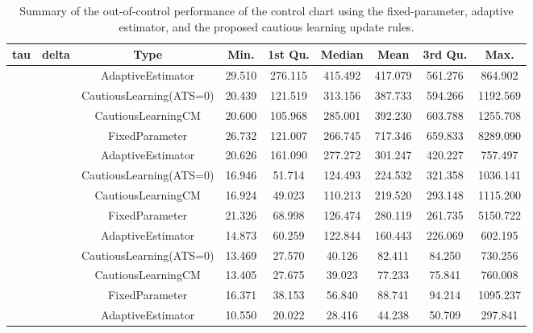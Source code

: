 \begin{table}[!h]

\caption{Summary of the out-of-control performance of the control chart using the fixed-parameter, adaptive estimator, and the proposed cautious learning update rules.}
\centering
\begin{tabular}[t]{ccccccccc}
\toprule
tau & delta & Type & Min. & 1st Qu. & Median & Mean & 3rd Qu. & Max.\\
\midrule
 &  & AdaptiveEstimator & 29.510 & 276.115 & 415.492 & 417.079 & 561.276 & 864.902\\

 &  & CautiousLearning(ATS=0) & 20.439 & 121.519 & 313.156 & 387.733 & 594.266 & 1192.569\\

 &  & CautiousLearningCM & 20.600 & 105.968 & 285.001 & 392.230 & 603.788 & 1255.708\\

 & \multirow[t]{-4}{*}{\centering\arraybackslash 0.25} & FixedParameter & 26.732 & 121.007 & 266.745 & 717.346 & 659.833 & 8289.090\\
\cmidrule{2-9}
 &  & AdaptiveEstimator & 20.626 & 161.090 & 277.272 & 301.247 & 420.227 & 757.497\\

 &  & CautiousLearning(ATS=0) & 16.946 & 51.714 & 124.493 & 224.532 & 321.358 & 1036.141\\

 &  & CautiousLearningCM & 16.924 & 49.023 & 110.213 & 219.520 & 293.148 & 1115.200\\

 & \multirow[t]{-4}{*}{\centering\arraybackslash 0.35} & FixedParameter & 21.326 & 68.998 & 126.474 & 280.119 & 261.735 & 5150.722\\
\cmidrule{2-9}
 &  & AdaptiveEstimator & 14.873 & 60.259 & 122.844 & 160.443 & 226.069 & 602.195\\

 &  & CautiousLearning(ATS=0) & 13.469 & 27.570 & 40.126 & 82.411 & 84.250 & 730.256\\

 &  & CautiousLearningCM & 13.405 & 27.675 & 39.023 & 77.233 & 75.841 & 760.008\\

 & \multirow[t]{-4}{*}{\centering\arraybackslash 0.50} & FixedParameter & 16.371 & 38.153 & 56.840 & 88.741 & 94.214 & 1095.237\\
\cmidrule{2-9}
 &  & AdaptiveEstimator & 10.550 & 20.022 & 28.416 & 44.238 & 50.709 & 297.841\\


\end{tabular}
\end{table}
